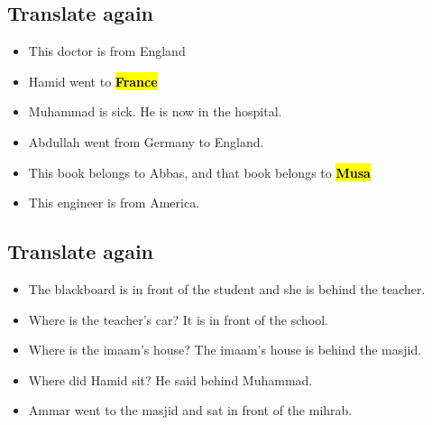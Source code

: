 \subsection{Translate again}
\begin{itemize}
    \item This doctor is from England  \\[0.1in]\answerline
    \item Hamid went to \hl{\textbf{France}} \\[0.1in]\answerline
    
    \item Muhammad is sick. He is now in the hospital. \\[0.1in]\answerline
    \item Abdullah went from Germany to England.  \\[0.1in]\answerline
    \item This book belongs to Abbas, and that book belongs to \hl{\textbf{Musa}} \\[0.1in]\answerline
    \item This engineer is from America. \\[0.1in]\answerline
\end{itemize}

\subsection{Translate again}
\begin{itemize}
    \item The blackboard is in front of the student and she is behind the teacher. \\[0.1in]\answerline
    \item Where is the teacher's car? It is in front of the school. \\[0.1in]\answerline
    \item Where is the imaam's house? The imaam's house is behind the masjid. \\[0.1in]\answerline
    \item Where did Hamid sit? He said behind Muhammad. \\[0.1in]\answerline
    \item Ammar went to the masjid and sat in front of the mihrab. \\[0.1in]\answerline
\end{itemize}